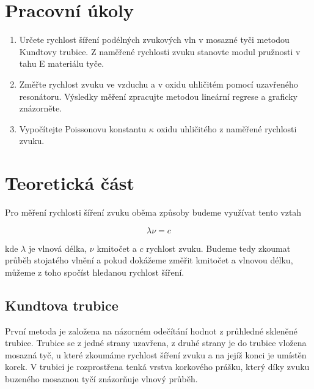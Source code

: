 \section{Pracovní úkoly}

\begin{enumerate}
\item Určete rychlost šíření podélných zvukových vln v mosazné tyči metodou Kundtovy trubice. Z naměřené rychlosti zvuku stanovte modul pružnosti v tahu E materiálu tyče.

\item Změřte rychlost zvuku ve vzduchu a v oxidu uhličitém pomocí uzavřeného resonátoru. Výsledky měření zpracujte metodou lineární regrese a graficky znázorněte.

\item Vypočítejte Poissonovu konstantu \( \kappa \) oxidu uhličitého z naměřené rychlosti zvuku.

\end{enumerate}
\section{Teoretická část}

Pro měření rychlosti šíření zvuku oběma způsoby budeme využívat tento vztah

\begin{equation}
    \lambda \nu = c
\end{equation}

kde \( \lambda \) je vlnová délka, \( \nu \) kmitočet a \(c\) rychlost zvuku. Budeme tedy zkoumat průběh stojatého vlnění a pokud dokážeme změřit kmitočet a vlnovou délku, můžeme z toho spočíst hledanou rychlost šíření.

\subsection{Kundtova trubice}
První metoda je založena na názorném odečítání hodnot z průhledné skleněné trubice. Trubice se z jedné strany uzavřena, z druhé strany je do trubice vložena mosazná tyč, u které zkoumáme rychlost šíření zvuku a na jejíž konci je umístěn korek. V trubici je rozprostřena tenká vrstva korkového prášku, který díky zvuku buzeného mosaznou tyčí znázorňuje vlnový průběh.

